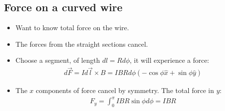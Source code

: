 \documentclass[aspectratio=169,
hyperref={colorlinks,urlcolor=blue}
]{beamer}
\begin{document}
\subsection{Force on a curved wire}
\label{subsec:forceonacurvedwire}
{%
\begin{itemize}%
\item<1-> Want to know total force on the wire. %
\item<2-> The forces from the straight sections cancel.%
\item<3-> Choose a segment, of length $dl=R d\phi$, it will experience a force:%
\begin{align*}%
d\vec F = I d\vec l \times B=IBR d\phi(-\cos\phi\hat x+\sin\phi\hat y)%
\end{align*}%
\item<4-> The $x$ components of force cancel by symmetry. The total force in $y$:%
\begin{align*}%
F_y=\int_0^{\pi} IB R\sin\phi d\phi=IBR%
\end{align*}%
\end{itemize}%
\vspace{-0.2cm}
}
\end{document}

